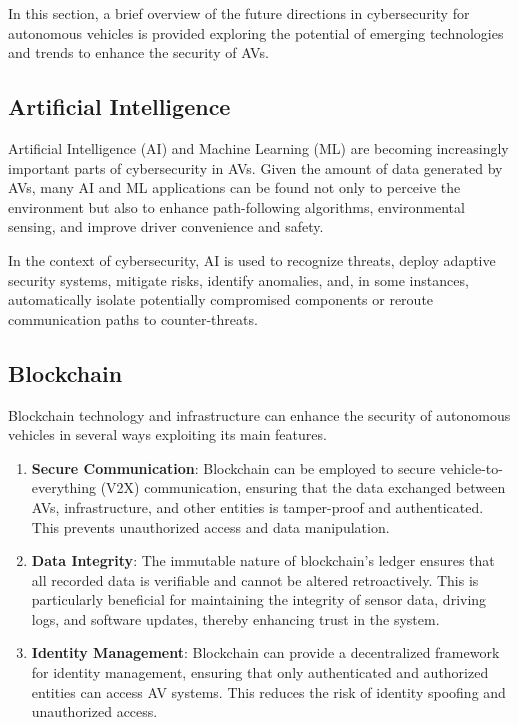 In this section, a brief overview of the future directions in cybersecurity for autonomous vehicles is provided
exploring the potential of emerging technologies and trends to enhance the security of AVs.

\subsection{Artificial Intelligence}\label{subsec:artificial-intelligence}
Artificial Intelligence (AI) and Machine Learning (ML)
are becoming increasingly important parts of cybersecurity in AVs.
Given the amount of data generated by AVs,
many AI and ML applications can be found not only to perceive the environment
but also to enhance path-following algorithms, environmental sensing,
and improve driver convenience and safety\cite{giannaros2023autonomous}.

In the context of cybersecurity, AI is used to recognize threats,
deploy adaptive security systems, mitigate risks, identify anomalies,
and, in some instances,
automatically isolate potentially compromised components
or reroute communication paths to counter-threats\cite{durlik2022cybersecurity}.

\subsection{Blockchain}\label{subsec:blockchain}

Blockchain technology and infrastructure can enhance the security of autonomous vehicles in several ways exploiting its main features.

\begin{enumerate}
    \item \textbf{Secure Communication}: Blockchain can be employed to secure vehicle-to-everything (V2X) communication,
    ensuring that the data exchanged between AVs, infrastructure, and other entities is tamper-proof and authenticated.
    This prevents unauthorized access and data manipulation.
    \item \textbf{Data Integrity}: The immutable nature of blockchain’s ledger ensures that all recorded data is verifiable
    and cannot be altered retroactively.
    This is particularly beneficial for maintaining the integrity of sensor data, driving logs, and software updates,
    thereby enhancing trust in the system.
    \item \textbf{Identity Management}: Blockchain can provide a decentralized framework for identity management,
    ensuring that only authenticated and authorized entities can access AV systems.
    This reduces the risk of identity spoofing and unauthorized access.
\end{enumerate}

